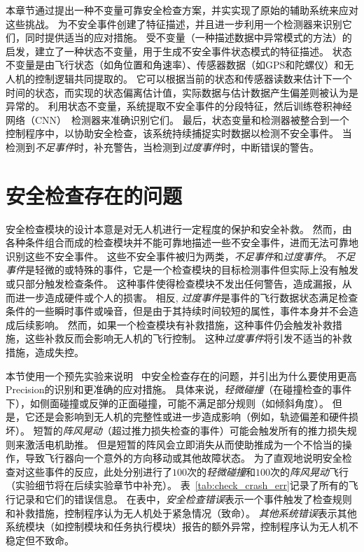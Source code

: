 本章节通过提出一种不变量可靠安全检查方案，并实实现了原始的辅助系统\deccheck 来应对这些挑战。
\deccheck 为不安全事件创建了特征描述，并且进一步利用一个检测器来识别它们，同时提供适当的应对措施。
受不变量（一种描述数据中异常模式的方法）的启发，\deccheck 建立了一种状态不变量，用于生成不安全事件状态模式的特征描述。
状态不变量是由飞行状态（如角位置和角速率）、传感器数据（如GPS和陀螺仪）和无人机的控制逻辑共同提取的。
它可以根据当前的状态和传感器读数来估计下一个时间的状态，而实现的状态偏离估计值，实际数据与估计数据产生偏差则被认为是异常的。
利用状态不变量，系统提取不安全事件的分段特征，然后训练卷积神经网络（CNN）~\cite{cnn}检测器来准确识别它们。
最后，状态变量和检测器被整合到一个控制程序中，以协助安全检查，该系统持续捕捉实时数据以检测不安全事件。
当检测到\emph{不足事件}时，\deccheck 补充警告，当检测到\emph{过度事件}时，中断错误的警告。

\section{安全检查存在的问题}\label{sec:check_problem}
安全检查模块的设计本意是对无人机进行一定程度的保护和安全补救。
然而，由各种条件组合而成的检查模块并不能可靠地描述一些不安全事件，进而无法可靠地识别这些不安全事件。
这些不安全事件被归为两类，\emph{不足事件}和\emph{过度事件}。
\emph{不足事件}是轻微的或特殊的事件，它是一个检查模块的目标检测事件但实际上没有触发或只部分触发检查条件。
这种事件使得检查模块不发出任何警告，造成漏报，从而进一步造成硬件或个人的损害。
相反, \emph{过度事件}是事件的飞行数据状态满足检查条件的一些瞬时事件或噪音，但是由于其持续时间较短的属性，事件本身并不会造成后续影响。
然而，如果一个检查模块有补救措施，这种事件仍会触发补救措施，这些补救反而会影响无人机的飞行控制。
这种\emph{过度事件}将引发不适当的补救措施，造成失控。

本节使用一个预先实验来说明 ~\cite{ardupilot}中安全检查存在的问题，并引出为什么要使用更高Precision的识别和更准确的应对措施。
具体来说，\emph{轻微碰撞}（在碰撞检查的事件下），如侧面碰撞或反弹的正面碰撞，可能不满足部分规则（如倾斜角度）。
但是，它还是会影响到无人机的完整性或进一步造成影响（例如，轨迹偏差和硬件损坏）。
短暂的\emph{阵风晃动}（超过推力损失检查的事件）可能会触发所有的推力损失规则来激活电机助推。
但是短暂的阵风会立即消失从而使助推成为一个不恰当的操作，导致飞行器向一个意外的方向移动或其他故障状态。
为了直观地说明安全检查对这些事件的反应，此处分别进行了$100$次的\emph{轻微碰撞}和$100$次的\emph{阵风晃动}飞行（实验细节将在后续实验章节中补充）。
表~\ref{tab:check_crash_err}记录了所有的飞行记录和它们的错误信息。
在表中，\emph{安全检查错误}表示一个事件触发了检查规则和补救措施，控制程序认为无人机处于紧急情况（致命）。
\emph{其他系统错误}表示其他系统模块（如控制模块和任务执行模块）报告的额外异常，控制程序认为无人机不稳定但不致命。

